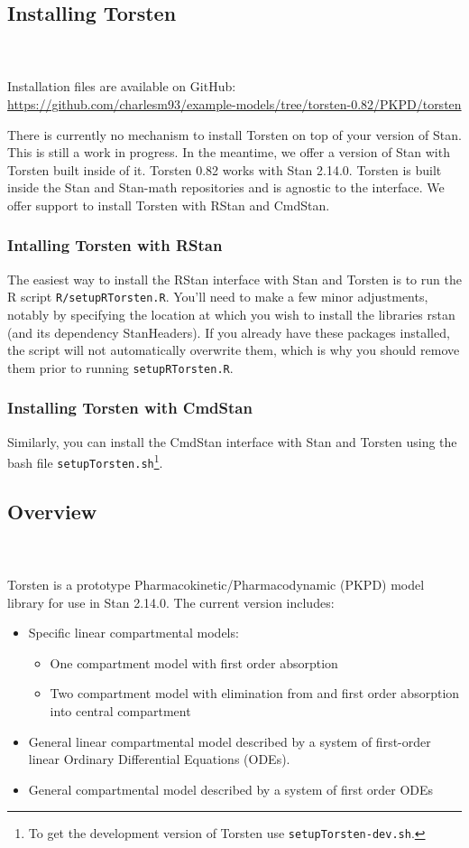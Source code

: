\documentclass[11pt]{amsart}
\begin{document}
\subsection{Installing Torsten}  \ \\ \ \\  
Installation files are available on GitHub: \url{https://github.com/charlesm93/example-models/tree/torsten-0.82/PKPD/torsten}

There is currently no mechanism to install Torsten on top of your version of Stan. This is still a work in progress. In the meantime, we offer a version of Stan with Torsten built inside of it. Torsten 0.82 works with Stan 2.14.0. Torsten is built inside the Stan and Stan-math repositories and is agnostic to the interface. We offer support to install Torsten with RStan and CmdStan.

\subsubsection{Intalling Torsten with RStan} The easiest way to install the RStan interface with Stan and Torsten is to run the R script \texttt{R/setupRTorsten.R}. You'll need to make a few minor adjustments, notably by specifying the location at which you wish to install the libraries rstan (and its dependency StanHeaders). If you already have these packages installed, the script will not automatically overwrite them, which is why you should remove them prior to running \texttt{setupRTorsten.R}. 

\subsubsection{Installing Torsten with CmdStan} Similarly, you can install the CmdStan interface with Stan and Torsten using the bash file \texttt{setupTorsten.sh}\footnote{To get the development version of Torsten use \texttt{setupTorsten-dev.sh}.}.

\subsection{Overview} \ \\ \ \\
Torsten is a prototype Pharmacokinetic/Pharmacodynamic (PKPD) model library for use in Stan 2.14.0. The current version includes:
\begin{itemize}
  \item Specific linear compartmental models:
  \begin{itemize}
    \item One compartment model with first order absorption
    \item Two compartment model with elimination from and first order absorption into central compartment
  \end{itemize}
  \item General linear compartmental model described by a system of first-order linear Ordinary Differential Equations (ODEs).
  \item General compartmental model described by a system of first order ODEs 
 \end{itemize}
\end{document}
